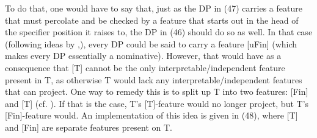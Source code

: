 \documentclass[output=paper
,modfonts
,nonflat]{langsci/langscibook}
\begin{document}
To do that, one would have to say that, just as the DP in (47) carries a feature that must percolate and be checked by a feature that starts out in the head of the specifier position it raises to, the DP in (46) should do so as well. In that case (following ideas by \citealt{Pesetsky_Torrego2004},\citealt{Pesetsky_Torrego2007}), every DP could be said to carry a feature [uFin] (which makes every DP essentially a nominative). However, that would have as a consequence that [T] cannot be the only interpretable/independent feature present in T, as otherwise T would lack any interpretable/independent features that can project. One way to remedy this is to split up T into two features: [Fin] and [T] (cf. \citealt{Koeneman_Zeijlstra2017}). If that is the case, T’s [T]-feature would no longer project, but T’s [Fin]-feature would. An implementation of this idea is given in (48), where [T] and [Fin] are separate features present on T. 
\end{document}
